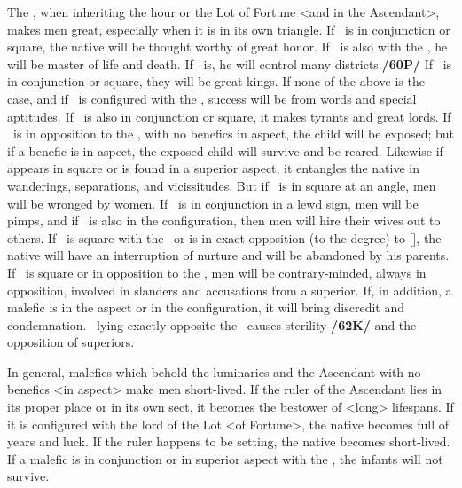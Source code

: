 The \Moon, when inheriting the hour or the Lot of Fortune <and in the Ascendant>, makes men great, especially when it is in its own triangle. If \Venus\, is in conjunction or square, the native will be thought worthy of great honor. If \Mars\, is also with the \Moon, he will be master of life and death. If \Saturn\, is, he will control many districts.\textbf{/60P/} If \Jupiter\, is in conjunction or square, they will be great kings. If none of the above is the case, and if \Mercury\, is configured with the \Moon, success will be from words and special aptitudes. If \Mars\, is also in conjunction or square, it makes tyrants and great lords. If \Mars\, is in opposition to the \Moon, with no benefics in aspect, the child will be exposed; but if a benefic is in aspect, the exposed child will survive and be reared. Likewise if \Mars\, appears in square or is found in a superior aspect, it entangles the native in wanderings, separations, and vicissitudes. But if \Venus\, is in square at an angle, men will be wronged by women. If \Saturn\, is in conjunction in a lewd sign, men will be pimps, and if \Mars\, is also in the configuration, then men will hire their wives out to others. If \Saturn\, is square with the \Moon\, or is in \mned exact opposition (to the degree) to [\Saturn], the native will have an interruption of nurture and will be abandoned by his parents. If \Mercury\, is square or in opposition to the \Moon, men will be contrary-minded, always in opposition, involved in slanders and accusations from a superior. If, in addition, a malefic is in the aspect or in the configuration, it will bring discredit and condemnation. \Jupiter\, lying \mned exactly opposite the \Moon\, causes sterility \textbf{/62K/} and the opposition of superiors.

\mndl[0.2cm]
In general, malefics which behold the luminaries and the Ascendant with no benefics <in aspect> make men short-lived. If the ruler of the Ascendant lies in its proper place or in its own sect, it becomes the bestower of <long> lifespans. If it is configured with the lord of the Lot <of Fortune>, the native becomes full of years and luck. If the ruler happens to be setting, the native becomes short-lived. If a malefic is in conjunction or in superior aspect with the \Moon, the infants will not survive.

\newpage